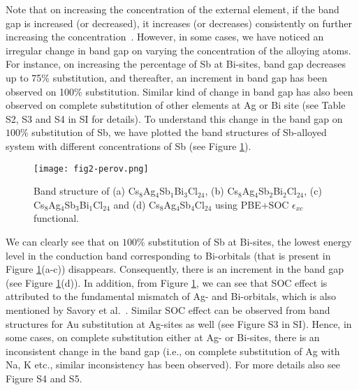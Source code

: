 \documentclass[journal=jpclcd,manuscript=letter]{achemso}
\begin{document}
Note that on increasing the concentration of the external element, if the band gap is increased (or decreased), it increases (or decreases) consistently on further increasing the concentration~\cite{MK3}. However, in some cases, we have noticed an irregular change in band gap on varying the concentration of the alloying atoms. For instance, on increasing the percentage of Sb at Bi-sites, band gap decreases up to 75\% substitution, and thereafter, an increment in band gap has been observed on 100\% substitution. Similar kind of change in band gap has also been observed on complete substitution of other elements at Ag or Bi site (see Table S2, S3 and S4 in SI for details). To understand this change in the band gap on $100\%$ substitution of Sb, we have plotted the band structures of Sb-alloyed system with different concentrations of Sb (see Figure \ref{fig2}).
\begin{figure}
	\texttt{[image: fig2-perov.png]}
	\caption{Band structure of (a) Cs$_8$Ag$_4$Sb$_1$Bi$_3$Cl$_{24}$, (b) Cs$_8$Ag$_4$Sb$_2$Bi$_2$Cl$_{24}$, (c) Cs$_8$Ag$_4$Sb$_3$Bi$_1$Cl$_{24}$ and (d) Cs$_8$Ag$_4$Sb$_4$Cl$_{24}$ using PBE+SOC $\epsilon_{xc}$ functional.}
	\label{fig2}
\end{figure}
We can clearly see that on $100\%$ substitution of Sb at Bi-sites, the lowest energy level in the conduction band corresponding to Bi-orbitals (that is present in Figure \ref{fig2}(a-c)) disappears. Consequently, there is an increment in the band gap (see Figure \ref{fig2}(d)). In addition, from Figure \ref{fig2}, we can see that SOC effect is attributed to the fundamental mismatch of Ag- and Bi-orbitals, which is also mentioned by Savory et al.~\cite{savory2016can}. Similar SOC effect can be observed from band structures for Au substitution at Ag-sites as well (see Figure S3 in SI). Hence, in some cases, on complete substitution either at Ag- or Bi-sites, there is an inconsistent change in the band gap (i.e., on complete substitution of Ag with Na, K etc., similar inconsistency has been observed). For more details also see Figure S4 and S5.    
\end{document}
